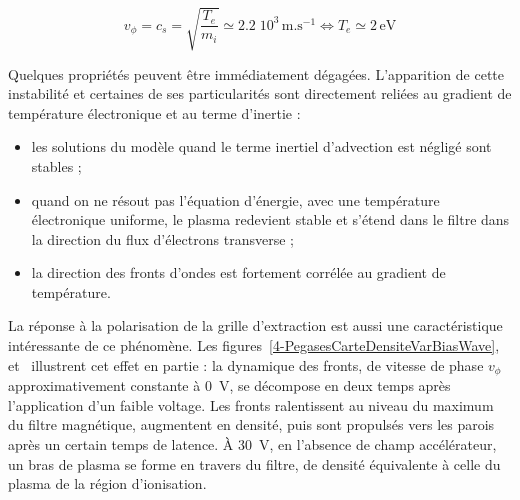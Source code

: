 \begin{refsection}
 \begin{equation}
 	v_\phi=c_{s}=\sqrt{\frac{T_e}{m_i}}\simeq 2.2\;10^{3}\,\text{m.s}^{-1}
 	\Leftrightarrow T_e\simeq 2\,\text{eV}
 \end{equation}
 
 Quelques propriétés peuvent être immédiatement dégagées. L'apparition de cette
 instabilité et certaines de ses particularités sont directement reliées au
 gradient de température électronique et au terme d'inertie :
 
 \begin{itemize}
   	\item les solutions du modèle quand le terme inertiel d'advection est
	négligé sont stables ;
   \item quand on ne résout pas l'équation d'énergie, avec une température
   électronique uniforme, le plasma redevient stable et s'étend dans le filtre
   dans la direction du flux d'électrons transverse ;
   \item la direction des fronts d'ondes est fortement corrélée au gradient
   de température.
\end{itemize}

La réponse à la polarisation de la grille d'extraction est aussi une
caractéristique intéressante de ce phénomène. Les
figures~\ref{4-PegasesCarteDensiteVarBiasWave}, 
et~ illustrent cet effet en partie : la
dynamique des fronts, de vitesse de phase $v_\phi$ approximativement constante à
0~V, se décompose en deux temps après l'application d'un faible voltage. Les
fronts ralentissent au niveau du maximum du filtre magnétique, augmentent en densité, puis sont
propulsés vers les parois après un certain temps de latence. À 30~V, en
l'absence de champ accélérateur, un bras de plasma se forme en travers du
filtre, de densité équivalente à celle du plasma de la région d'ionisation.
	

\end{refsection}
